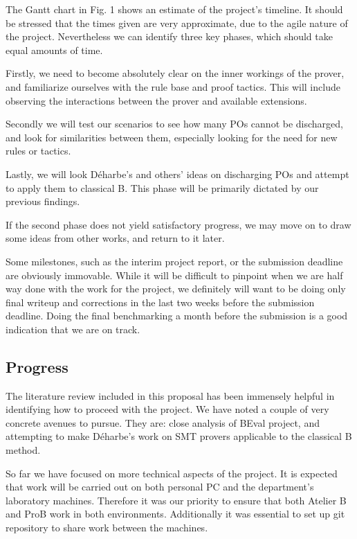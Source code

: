 \documentclass[11pt,journal]{IEEEtran}
\begin{document}
	The Gantt chart in Fig. 1 shows an estimate of the project's timeline. It should be stressed that the times given are very approximate, due to the agile nature of the project. Nevertheless we can identify three key phases, which should take equal amounts of time. 
	
	Firstly, we need to become absolutely clear on the inner workings of the prover, and familiarize ourselves with the rule base and proof tactics. This will include observing the interactions between the prover and available extensions.
	
	Secondly we will test our scenarios to see how many POs cannot be discharged, and look for similarities between them, especially looking for the need for new rules or tactics.
	
	Lastly, we will look  D\'{e}harbe's\cite{SMT} and others'\cite{discharging}\cite{Alt-Ergo} ideas on discharging POs and attempt to apply them to classical B. This phase will be primarily dictated by our previous findings.
	
	If the second phase does not yield satisfactory progress, we may move on to draw some ideas from other works, and return to it later.
	
	Some milestones, such as the interim project report, or the submission deadline are obviously immovable. While it will be difficult to pinpoint when we are half way done with the work for the project, we definitely will want to be doing only final writeup and corrections in the last two weeks before the submission deadline. Doing the final benchmarking a month before the submission is a good indication that we are on track.


		
	\subsection{Progress}
	The literature review included in this proposal has been immensely helpful in identifying how to proceed with the project. We have noted a couple of very concrete avenues to pursue. They are: close analysis of BEval project, and attempting to make D\'{e}harbe's work on SMT provers applicable to the classical B method.
	
	So far we have focused on more technical aspects of the project. It is expected that work will be carried out on both personal PC and the department's laboratory machines. Therefore it was our priority to ensure that both Atelier B and ProB work in both environments. Additionally it was essential to set up git repository to share work between the machines.
	
\end{document}
